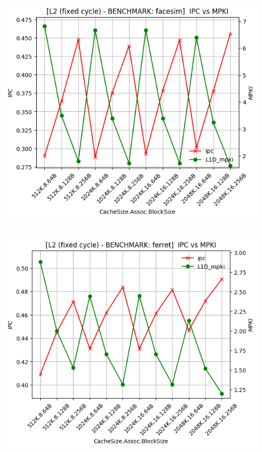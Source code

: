 \begin{minipage}{\textwidth}
    \begin{center}
        \\
        \vspace{3mm}
        \includegraphics[scale=0.70]{graphs/L2/fixed/facesim.png}
        \vspace{6mm}
    \end{center}
\end{minipage}

\begin{minipage}{\textwidth}
    \begin{center}
        \\
        \vspace{3mm}
        \includegraphics[scale=0.70]{graphs/L2/fixed/ferret.png}
        \vspace{6mm}
    \end{center}
\end{minipage}


